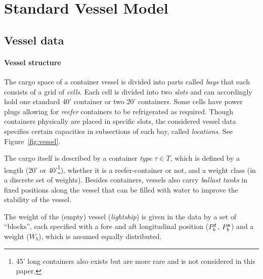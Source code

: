 %

%
\section{Standard Vessel Model}

\subsection*{Vessel data}
\paragraph{Vessel structure}
The cargo space of a container vessel is divided into parts called \textit{bays} that each consists of a grid of \emph{cells}. Each cell is divided into two \emph{slots} and can accordingly hold one standard 40' container or two 20' containers. Some cells have power plugs allowing for \emph{reefer} containers to be refrigerated as required. Though containers physically are placed in specific slots, the considered vessel data specifies certain capacities in subsections of each bay, called \emph{locations}. See Figure~\ref{fig:vessel}. 

The cargo itself is described by a container \emph{type} $\tau \in T$, which is defined by a length (20' or 40'\footnote{45' long containers also exists but are more rare and is not considered in this paper.}), whether it is a reefer-container or not, and a weight class (in a discrete set of weights). 
Besides containers, vessels also carry \emph{ballast tanks} in fixed positions along the vessel that can be filled with water to improve the stability of the vessel.

The weight of the (empty) vessel (\emph{lightship}) is given in the data by a set of ``blocks'', each specified with a fore and aft longitudinal position ($P^{\texttt{f}}_b$, $P^{\texttt{a}}_b$) and a weight ($W_b$), which is assumed equally distributed. 

